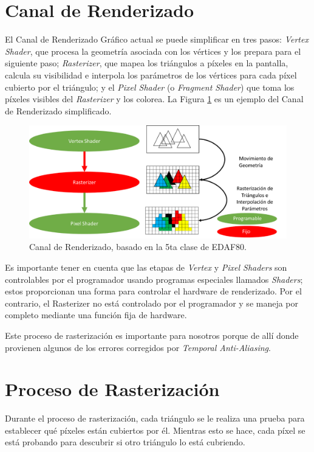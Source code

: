 \documentclass{cslthse-msc}
\begin{document}
\section{Canal de Renderizado}
El Canal de Renderizado Gráfico actual se puede simplificar en tres pasos: \textit{Vertex Shader}, que procesa la geometría asociada con los vértices y los prepara para el siguiente paso; \textit{Rasterizer}, que mapea los triángulos a píxeles en la pantalla, calcula su visibilidad e interpola los parámetros de los vértices para cada píxel cubierto por el triángulo; y el \textit{Pixel Shader} (o \textit{Fragment Shader}) que toma los píxeles visibles del \textit{Rasterizer} y los colorea. La Figura \ref{fig:graphpipeline} es un ejemplo del Canal de Renderizado simplificado.

\begin{figure}[!hbt]
	\centering
	\includegraphics[scale=0.7]{images/graphics_pipeline.png} 
	\caption{Canal de Renderizado, basado en la 5ta clase de EDAF80.~\cite{Doggett2017EDAF80}}\label{fig:graphpipeline}
\end{figure}

Es importante tener en cuenta que las etapas de \textit{Vertex} y \textit{Pixel Shaders} son controlables por el programador usando programas especiales llamados \textit{Shaders}; estos proporcionan una forma para controlar el hardware de renderizado. Por el contrario, el Rasterizer no está controlado por el programador y se maneja por completo mediante una función fija de hardware. \cite{Doggett2017EDAF80}

Este proceso de rasterización es importante para nosotros porque de allí donde provienen algunos de los errores corregidos por \textit{Temporal Anti-Aliasing}.


\section{Proceso de Rasterización}
Durante el proceso de rasterización, cada triángulo se le realiza una prueba para establecer qué píxeles están cubiertos por él. Mientras esto se hace, cada píxel se está probando para descubrir si otro triángulo lo está cubriendo.
\end{document}
